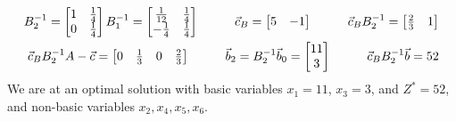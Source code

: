 \begin{align*}
B_2^{-1} =
\begin{bmatrix}
 1 & \frac{1}{4} \\
 0 & \frac{1}{4}
\end{bmatrix}
B_1^{-1}=  
\begin{bmatrix}
 \frac{1}{12} & \frac{1}{4} \\
 -\frac{1}{4} & \frac{1}{4}
\end{bmatrix}
\cm
\vec{c}_B = 
\begin{bmatrix}
  5 & -1
\end{bmatrix}
\cm
\vec{c}_B B_2^{-1} = 
\begin{bmatrix}
 \frac{2}{3} & 1
\end{bmatrix}
\\ %
\vec{c}_B B_2^{-1} A - \vec{c} = 
\begin{bmatrix}
 0 & \frac{1}{3} & 0 & \frac{2}{3}
\end{bmatrix}
\cm
\vec{b}_2 = B_2^{-1}\vec{b}_0 = 
\begin{bmatrix}
 11 \\
 3
\end{bmatrix}
\cm
\vec{c}_B B_2^{-1} \vec{b} = 52
\end{align*}
We are at an optimal solution with basic variables $x_1 = 11$, $x_3 = 3$, and $Z^* = 52$, and non-basic variables $x_2, x_4,x_5, x_6$.


